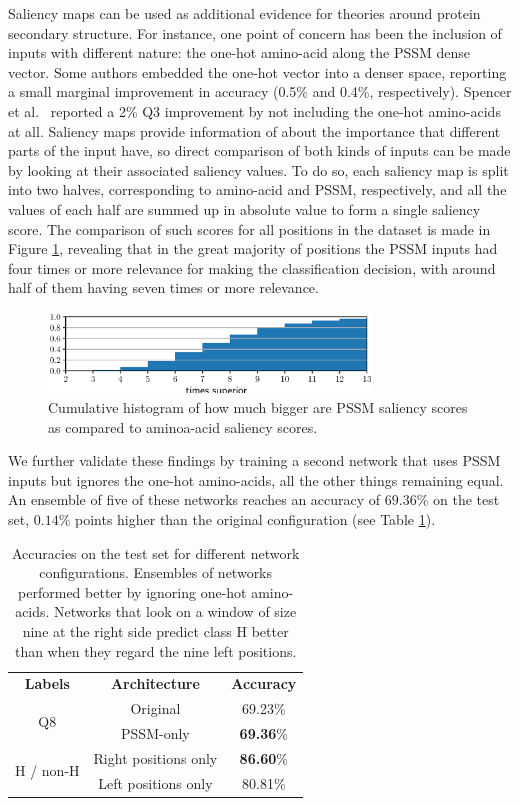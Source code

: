 \documentclass{article}
\begin{document}
Saliency maps can be used as additional evidence for theories around protein secondary structure. For instance, one point of concern has been the inclusion of inputs with different nature: the one-hot amino-acid along the PSSM dense vector. Some authors \cite{Li2016,Zhou2018} embedded the one-hot vector into a denser space, reporting a small marginal improvement in accuracy (0.5\% and 0.4\%, respectively). Spencer et al.~\cite{Spencer2015} reported a 2\% Q3 improvement by not including the one-hot amino-acids at all. Saliency maps provide information of about the importance that different parts of the input have, so direct comparison of both kinds of inputs can be made by looking at their associated saliency values. To do so, each saliency map is split into two halves, corresponding to amino-acid and PSSM, respectively, and all the values of each half are summed up in absolute value to form a single saliency score. The comparison of such scores for all positions in the dataset is made in Figure \ref{fig:aa_pssm}, revealing that in the great majority of positions the PSSM inputs had four times or more relevance for making the classification decision, with around half of them having seven times or more relevance.
\begin{figure}
	\centering
	\centerline{\includegraphics[width=8.6cm]{aa_pssm}}
	\caption{Cumulative histogram of how much bigger are PSSM saliency scores as compared to aminoa-acid saliency scores.}
	\label{fig:aa_pssm}
\end{figure}
We further validate these findings by training a second network that uses PSSM inputs but ignores the one-hot amino-acids, all the other things remaining equal. An ensemble of five of these networks reaches an accuracy of $69.36\%$ on the test set, $0.14\%$ points higher than the original configuration (see Table \ref{table:res}).
\begin{table}
	\centering
	\begin{tabular}{c|c|c}
		\textbf{Labels} 	& \textbf{Architecture} & \textbf{Accuracy} \\
		\multirow{2}{*}{Q8} & Original 			& 69.23\% \\
		& PSSM-only 		& \textbf{69.36}\% \\ \hline
		\multirow{2}{*}{H / non-H} & Right positions only & \textbf{86.60}\% \\
		& Left positions only & 80.81\%
	\end{tabular}
	\caption{Accuracies on the test set for different network configurations. Ensembles of networks performed better by ignoring one-hot amino-acids. Networks that look on a window of size nine at the right side predict class H better than when they regard the nine left positions.}
	\label{table:res}
\end{table}
\end{document}
